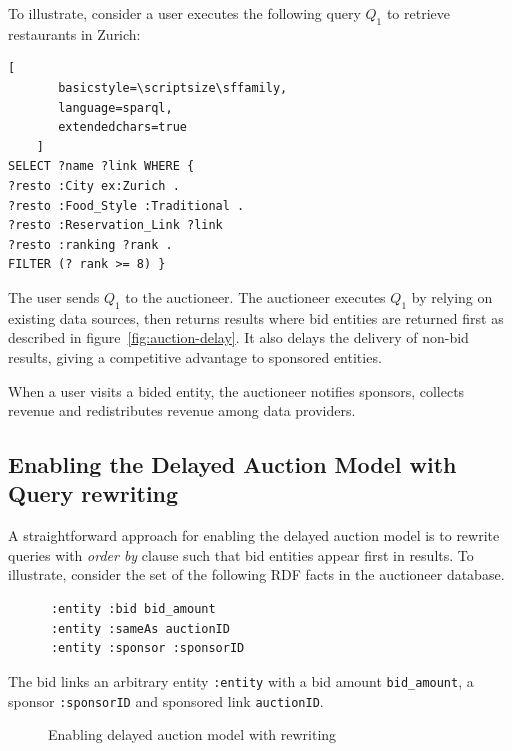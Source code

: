 \documentclass[runningheads]{llncs}
\begin{document}
To illustrate, consider a user executes the following query $Q_1$ to retrieve
restaurants in Zurich:
\begin{lstlisting}[
       basicstyle=\scriptsize\sffamily,
       language=sparql,
       extendedchars=true
    ]
SELECT ?name ?link WHERE {
?resto :City ex:Zurich . 
?resto :Food_Style :Traditional . 
?resto :Reservation_Link ?link 
?resto :ranking ?rank .
FILTER (? rank >= 8) }
\end{lstlisting}

The user sends $Q_1$ to the auctioneer. The auctioneer executes $Q_1$
by relying on existing data sources, then returns results where bid
entities are returned first as described in
figure~\ref{fig:auction-delay}. It also delays the delivery of
non-bid results, giving a competitive advantage to sponsored
entities.

When a user visits a bided entity, the auctioneer notifies sponsors,
collects revenue and redistributes revenue among data providers.

\subsection{Enabling the Delayed Auction Model with Query rewriting}

A straightforward approach for enabling the delayed auction model is
to rewrite queries with \emph{order by} clause such that bid entities
appear first in results. To illustrate, consider the set of the following  RDF facts in the auctioneer database. 

\begin{lstlisting}
      :entity :bid bid_amount
      :entity :sameAs auctionID
      :entity :sponsor :sponsorID
\end{lstlisting}

The bid links an arbitrary entity \verb+:entity+ with a bid amount
\verb+bid_amount+, a sponsor \verb+:sponsorID+ and sponsored link
\verb+auctionID+.


\begin{figure}
%
  \caption{Enabling delayed auction model with rewriting}
  \label{fig:rewriting}
\end{figure}
\end{document}
